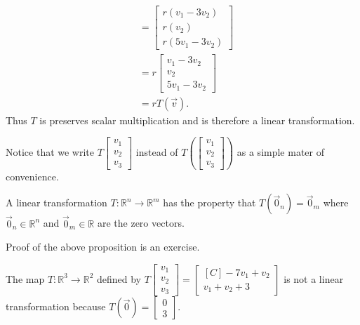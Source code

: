 \begin{example}
\begin{align*}
&= \begin{bmatrix}r(v_1-3v_2)\\r(v_2)\\r(5v_1-3v_2)\end{bmatrix}\\
&= r\begin{bmatrix}v_1-3v_2\\v_2\\5v_1-3v_2\end{bmatrix}\\
&= rT(\vec{v}).
\end{align*}
Thus $T$ is preserves scalar multiplication and is therefore a linear
transformation.
\end{example}

\begin{remark}
Notice that we write $T\begin{bmatrix}v_1\\v_2\\v_3\end{bmatrix}$ instead 
of  $T\left(\begin{bmatrix}v_1\\v_2\\v_3\end{bmatrix}\right)$ as a simple 
mater of convenience.
\end{remark}
\begin{proposition}
A linear transformation $T:\mathbb{R}^n \to \mathbb{R}^m$ has the property 
that $T(\vec{0}_n)=\vec{0}_m$ where $\vec{0}_n \in \mathbb{R}^n$ and 
$\vec{0}_m \in \mathbb{R}$ are the zero vectors.
\end{proposition}

Proof of the above proposition is an exercise.

\begin{example}The map $T:\mathbb{R}^3 \to \mathbb{R}^2$ defined by 
$T\begin{bmatrix}v_1 \\ v_2 \\ v_3\end{bmatrix}
=\begin{bmatrix*}[C]-7v_1+v_2 \\ v_1+v_2+3\end{bmatrix*}$ 
is not a linear transformation because $T(\vec{0})=\begin{bmatrix}0\\3\end{bmatrix}$.
\end{example}

